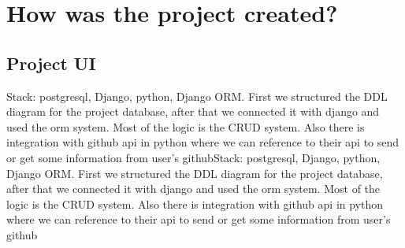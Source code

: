 \chapter{How was the project created?}\label{ch:B}

\section{Project UI}
Stack: postgresql, Django, python, Django ORM. First we structured the DDL diagram for the project database, after that we connected it with django and used the orm system. Most of the logic is the CRUD system. Also there is integration with github api in python where we can reference to their api to send or get some information from user’s githubStack: postgresql, Django, python, Django ORM. First we structured the DDL diagram for the project database, after that we connected it with django and used the orm system. Most of the logic is the CRUD system. Also there is integration with github api in python where we can reference to their api to send or get some information from user’s github %
